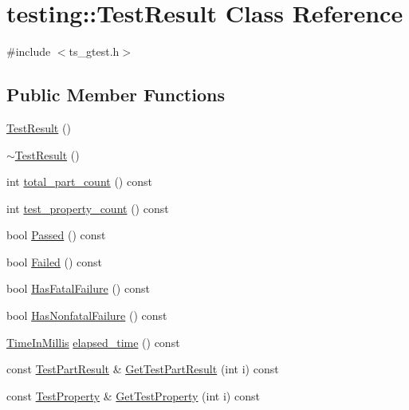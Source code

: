 \hypertarget{classtesting_1_1TestResult}{\section{testing\-:\-:Test\-Result Class Reference}
\label{classtesting_1_1TestResult}
}


{\ttfamily \#include $<$ts\-\_\-gtest.\-h$>$}

\subsection*{Public Member Functions}
\begin{DoxyCompactItemize}
\item 
\hyperlink{classtesting_1_1TestResult_a5cf5dd6f416b7334ea601aab21a2fda5}{Test\-Result} ()
\item 
\hyperlink{classtesting_1_1TestResult_a41f407680b725b75d7eadc3230bc3315}{$\sim$\-Test\-Result} ()
\item 
int \hyperlink{classtesting_1_1TestResult_ae6a378ec743edfbed55890c955d0adc8}{total\-\_\-part\-\_\-count} () const 
\item 
int \hyperlink{classtesting_1_1TestResult_a5075f9d595d51c7cc2f5c0921e622831}{test\-\_\-property\-\_\-count} () const 
\item 
bool \hyperlink{classtesting_1_1TestResult_aa46a04342f02ec297357f47288da3ef3}{Passed} () const 
\item 
bool \hyperlink{classtesting_1_1TestResult_abb5d051bf958071c14020132a4d6cc07}{Failed} () const 
\item 
bool \hyperlink{classtesting_1_1TestResult_ace61ce992083a9124f9ff0e99a2041cc}{Has\-Fatal\-Failure} () const 
\item 
bool \hyperlink{classtesting_1_1TestResult_a34e6901b9772f51ce4f17a5517c26607}{Has\-Nonfatal\-Failure} () const 
\item 
\hyperlink{namespacetesting_a992de1d091ce660f451d1e8b3ce30fd6}{Time\-In\-Millis} \hyperlink{classtesting_1_1TestResult_a582f6383265d0619df812b75499d0616}{elapsed\-\_\-time} () const 
\item 
const \hyperlink{classtesting_1_1TestPartResult}{Test\-Part\-Result} \& \hyperlink{classtesting_1_1TestResult_a5ea65e4a7c4fc9c9dc9578223a599a7c}{Get\-Test\-Part\-Result} (int i) const 
\item 
const \hyperlink{classtesting_1_1TestProperty}{Test\-Property} \& \hyperlink{classtesting_1_1TestResult_a89a4f580a5d969b36e016cd309b235bd}{Get\-Test\-Property} (int i) const 
\end{DoxyCompactItemize}
